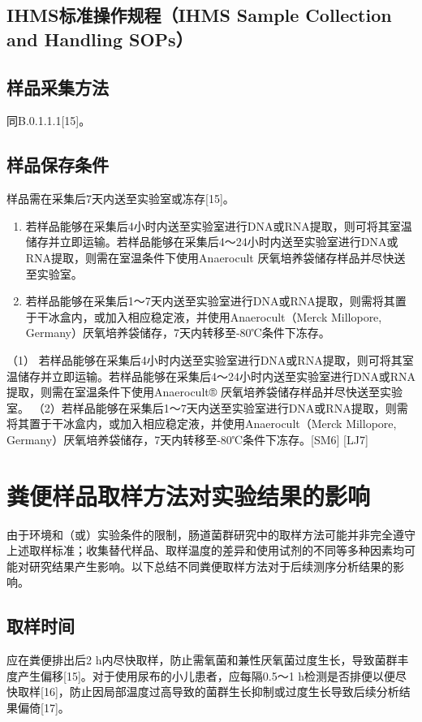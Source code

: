 \subsection{IHMS标准操作规程（IHMS Sample Collection and Handling SOPs）}
\subsection{样品采集方法}
同B.0.1.1.1[15]。
\subsection{样品保存条件}
样品需在采集后7天内送至实验室或冻存[15]。
\begin{enumerate}
  \item 若样品能够在采集后4小时内送至实验室进行DNA或RNA提取，则可将其室温储存并立即运输。若样品能够在采集后4～24小时内送至实验室进行DNA或RNA提取，则需在室温条件下使用Anaerocult\textsuperscript{\textregistered} 厌氧培养袋储存样品并尽快送至实验室。
  \item 若样品能够在采集后1～7天内送至实验室进行DNA或RNA提取，则需将其置于干冰盒内，或加入相应稳定液，并使用Anaerocult\textsuperscript{\textregistered}（Merck Millopore, Germany）厌氧培养袋储存，7天内转移至-80℃条件下冻存。
\end{enumerate}

（1） 若样品能够在采集后4小时内送至实验室进行DNA或RNA提取，则可将其室温储存并立即运输。若样品能够在采集后4～24小时内送至实验室进行DNA或RNA提取，则需在室温条件下使用Anaerocult® 厌氧培养袋储存样品并尽快送至实验室。
（2）若样品能够在采集后1～7天内送至实验室进行DNA或RNA提取，则需将其置于干冰盒内，或加入相应稳定液，并使用Anaerocult\textsuperscript{\textregistered}（Merck Millopore, Germany）厌氧培养袋储存，7天内转移至-80℃条件下冻存。[SM6] [LJ7]
\section{粪便样品取样方法对实验结果的影响}
由于环境和（或）实验条件的限制，肠道菌群研究中的取样方法可能并非完全遵守上述取样标准；收集替代样品、取样温度的差异和使用试剂的不同等多种因素均可能对研究结果产生影响。以下总结不同粪便取样方法对于后续测序分析结果的影响。
\subsection{取样时间}
应在粪便排出后2 h内尽快取样，防止需氧菌和兼性厌氧菌过度生长，导致菌群丰度产生偏移[15]。对于使用尿布的小儿患者，应每隔0.5～1 h检测是否排便以便尽快取样[16]，防止因局部温度过高导致的菌群生长抑制或过度生长导致后续分析结果偏倚[17]。
